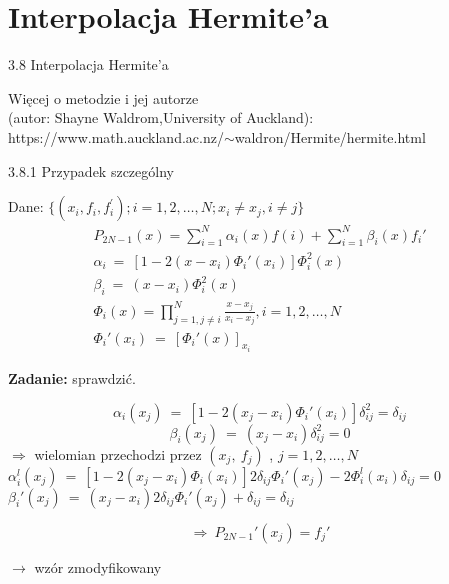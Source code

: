 \section{Interpolacja Hermite'a}
\begin{frame}
{3.8 Interpolacja Hermite'a}

Więcej o metodzie i jej autorze \\
(autor: Shayne Waldrom,University of Auckland):\\
\vspace{5mm}
https://www.math.auckland.ac.nz/$\sim$waldron/Hermite/hermite.html
\end{frame}

\begin{frame}
{3.8.1 Przypadek szczególny}

Dane: $\{(x_{i}, f_{i}, f_{i}^{'}); i=1,2, \dots, N; x_{i}\neq x_{j}, i\neq j\}$
\begin{gather*}
  P_{2N-1}(x)=\sum_{i=1}^{N}\alpha_{i}(x)f(i)+\sum_{i=1}^{N}\beta_{i}(x)f_{i}'\\
  \alpha_{i}\ =\ [1-2(x-x_{i})\Phi_{i}'(x_{i})]\Phi_{i}^{2}(x)\\
  \beta_{i}\ =\ (x-x_{i})\Phi_{i}^{2}(x)\\
  \Phi_{i}(x) = \displaystyle \prod_{j=1,j\neq i}^{N}\frac{x-x_{j}}{x_{i}-x_{j}}, i=1, 2,\dots, N\\
  \Phi_{i}'(x_{i})\ =\ [\Phi_{i}'(x)]_{x_{i}}
\end{gather*}

\textbf{Zadanie:} sprawdzić.


\end{frame}

\begin{frame}
$$
\alpha_{i}(x_{j})\ =\ [1-2(x_{j}-x_{i})\Phi_{i}'(x_{i})]\delta_{ij}^{2}=\delta_{ij}
$$
$$
\beta_{i}(x_{j})\ =\ (x_{j}-x_{i})\delta_{ij}^{2}=0
$$
$\Rightarrow$ wielomian przechodzi przez $(x_{j},\ f_{j})$ , $j=1,2, \dots, N$ \\
\vspace{3mm}
$\alpha_{i}^{l}(x_{j})\ =\ [1-2(x_{j}-x_{i})\Phi_{i}(x_{i})]2\delta_{ij}\Phi_{i}'(x_{j})-2\Phi_{i}^{l}(x_{i})\delta_{ij}=0$ \\
\vspace{3mm}
$\beta_{i}'(x_{j})\ =\ (x_{j}-x_{i})2\delta_{ij}\Phi_{i}'(x_{j})+\delta_{ij}=\delta_{ij}$

$$
\Rightarrow\ P_{2N-1}'(x_{j})=f_{j}'
$$
\begin{flushright}$\rightarrow$ wzór zmodyfikowany \end{flushright}
\end{frame}

